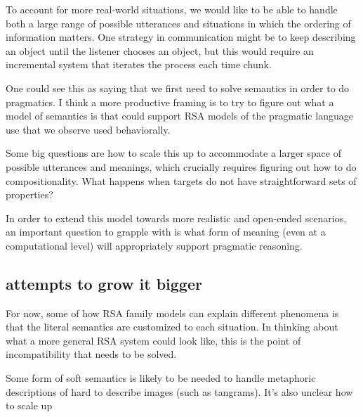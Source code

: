 \documentclass[]{article}
\begin{document}
To account for more real-world situations, we would like to be able to handle both a large range of possible utterances and situations in which the ordering of information matters. One strategy in communication might be to keep describing an object until the listener chooses an object, but this would require an incremental system that iterates the process each time chunk.

One could see this as saying that we first need to solve semantics in order to do pragmatics. I think a more productive framing is to try to figure out what a model of semantics is that could support RSA models of the pragmatic language use that we observe used behaviorally. 


Some big questions are how to scale this up to accommodate a larger space of possible utterances and meanings, which crucially requires figuring out how to do compositionality. What happens when targets do not have straightforward sets of properties? 



In order to extend this model towards more realistic and open-ended scenarios, an important question to grapple with is what form of meaning (even at a computational level) will appropriately support pragmatic reasoning. 





\subsection{attempts to grow it bigger}


For now, some of how RSA family models can explain different phenomena is that the literal semantics are customized to each situation. In thinking about what a more general RSA system could look like, this is the point of incompatibility that needs to be solved. 

Some form of soft semantics is likely to be needed to handle metaphoric descriptions of hard to describe images (such as tangrams). It's also unclear how to scale up 
\end{document}
